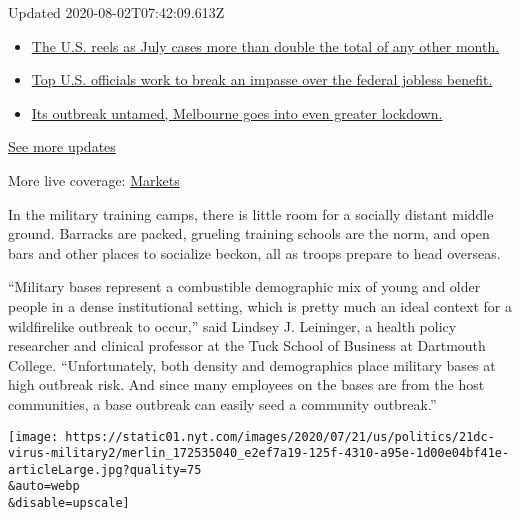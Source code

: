 Updated 2020-08-02T07:42:09.613Z

\begin{itemize}
\tightlist
\item
  \href{https://www.nytimes.com/2020/08/01/world/coronavirus-covid-19.html?action=click\&pgtype=Article\&state=default\&region=MAIN_CONTENT_1\&context=storylines_live_updates\#link-34047410}{The
  U.S. reels as July cases more than double the total of any other
  month.}
\item
  \href{https://www.nytimes.com/2020/08/01/world/coronavirus-covid-19.html?action=click\&pgtype=Article\&state=default\&region=MAIN_CONTENT_1\&context=storylines_live_updates\#link-780ec966}{Top
  U.S. officials work to break an impasse over the federal jobless
  benefit.}
\item
  \href{https://www.nytimes.com/2020/08/01/world/coronavirus-covid-19.html?action=click\&pgtype=Article\&state=default\&region=MAIN_CONTENT_1\&context=storylines_live_updates\#link-2bc8948}{Its
  outbreak untamed, Melbourne goes into even greater lockdown.}
\end{itemize}

\href{https://www.nytimes.com/2020/08/01/world/coronavirus-covid-19.html?action=click\&pgtype=Article\&state=default\&region=MAIN_CONTENT_1\&context=storylines_live_updates}{See
more updates}

More live coverage:
\href{https://www.nytimes.com/live/2020/07/31/business/stock-market-today-coronavirus?action=click\&pgtype=Article\&state=default\&region=MAIN_CONTENT_1\&context=storylines_live_updates}{Markets}

In the military training camps, there is little room for a socially
distant middle ground. Barracks are packed, grueling training schools
are the norm, and open bars and other places to socialize beckon, all as
troops prepare to head overseas.

``Military bases represent a combustible demographic mix of young and
older people in a dense institutional setting, which is pretty much an
ideal context for a wildfirelike outbreak to occur,'' said Lindsey J.
Leininger, a health policy researcher and clinical professor at the Tuck
School of Business at Dartmouth College. ``Unfortunately, both density
and demographics place military bases at high outbreak risk. And since
many employees on the bases are from the host communities, a base
outbreak can easily seed a community outbreak.''

\texttt{[image: https://static01.nyt.com/images/2020/07/21/us/politics/21dc-virus-military2/merlin\_172535040\_e2ef7a19-125f-4310-a95e-1d00e04bf41e-articleLarge.jpg?quality=75\\\&auto=webp\\\&disable=upscale]}

